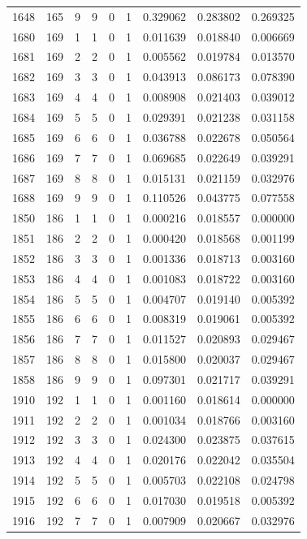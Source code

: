 \begin{longtable}{rrrrrrrrr}
1648 & 165 & 9 & 9 & 0 & 1 & 0.329062 & 0.283802 & 0.269325 \\
1680 & 169 & 1 & 1 & 0 & 1 & 0.011639 & 0.018840 & 0.006669 \\
1681 & 169 & 2 & 2 & 0 & 1 & 0.005562 & 0.019784 & 0.013570 \\
1682 & 169 & 3 & 3 & 0 & 1 & 0.043913 & 0.086173 & 0.078390 \\
1683 & 169 & 4 & 4 & 0 & 1 & 0.008908 & 0.021403 & 0.039012 \\
1684 & 169 & 5 & 5 & 0 & 1 & 0.029391 & 0.021238 & 0.031158 \\
1685 & 169 & 6 & 6 & 0 & 1 & 0.036788 & 0.022678 & 0.050564 \\
1686 & 169 & 7 & 7 & 0 & 1 & 0.069685 & 0.022649 & 0.039291 \\
1687 & 169 & 8 & 8 & 0 & 1 & 0.015131 & 0.021159 & 0.032976 \\
1688 & 169 & 9 & 9 & 0 & 1 & 0.110526 & 0.043775 & 0.077558 \\
1850 & 186 & 1 & 1 & 0 & 1 & 0.000216 & 0.018557 & 0.000000 \\
1851 & 186 & 2 & 2 & 0 & 1 & 0.000420 & 0.018568 & 0.001199 \\
1852 & 186 & 3 & 3 & 0 & 1 & 0.001336 & 0.018713 & 0.003160 \\
1853 & 186 & 4 & 4 & 0 & 1 & 0.001083 & 0.018722 & 0.003160 \\
1854 & 186 & 5 & 5 & 0 & 1 & 0.004707 & 0.019140 & 0.005392 \\
1855 & 186 & 6 & 6 & 0 & 1 & 0.008319 & 0.019061 & 0.005392 \\
1856 & 186 & 7 & 7 & 0 & 1 & 0.011527 & 0.020893 & 0.029467 \\
1857 & 186 & 8 & 8 & 0 & 1 & 0.015800 & 0.020037 & 0.029467 \\
1858 & 186 & 9 & 9 & 0 & 1 & 0.097301 & 0.021717 & 0.039291 \\
1910 & 192 & 1 & 1 & 0 & 1 & 0.001160 & 0.018614 & 0.000000 \\
1911 & 192 & 2 & 2 & 0 & 1 & 0.001034 & 0.018766 & 0.003160 \\
1912 & 192 & 3 & 3 & 0 & 1 & 0.024300 & 0.023875 & 0.037615 \\
1913 & 192 & 4 & 4 & 0 & 1 & 0.020176 & 0.022042 & 0.035504 \\
1914 & 192 & 5 & 5 & 0 & 1 & 0.005703 & 0.022108 & 0.024798 \\
1915 & 192 & 6 & 6 & 0 & 1 & 0.017030 & 0.019518 & 0.005392 \\
1916 & 192 & 7 & 7 & 0 & 1 & 0.007909 & 0.020667 & 0.032976 \\

\end{longtable}
